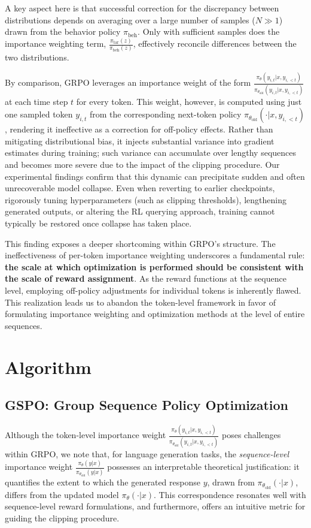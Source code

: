 A key aspect here is that successful correction for the discrepancy between distributions depends on averaging over a large number of samples ($N \gg 1$) drawn from the behavior policy $\pi_\text{beh}$. Only with sufficient samples does the importance weighting term, $\frac{ \pi_\text{tar} (z) }{ \pi_\text{beh} (z)}$, effectively reconcile differences between the two distributions.

By comparison, GRPO leverages an importance weight of the form $\frac{ \pi_{\theta} (y_{i,t} | x, y_{i,<t}) }{ \pi_{\theta_\text{old}} (y_{i,t} | x,y_{i,<t})}$ at each time step $t$ for every token. This weight, however, is computed using just one sampled token $y_{i,t}$ from the corresponding next-token policy $\pi_{\theta_\text{old}}( \cdot | x, y_{i, <t})$, rendering it ineffective as a correction for off-policy effects. Rather than mitigating distributional bias, it injects substantial variance into gradient estimates during training; such variance can accumulate over lengthy sequences and becomes more severe due to the impact of the clipping procedure. Our experimental findings confirm that this dynamic can precipitate sudden and often unrecoverable model collapse. Even when reverting to earlier checkpoints, rigorously tuning hyperparameters (such as clipping thresholds), lengthening generated outputs, or altering the RL querying approach, training cannot typically be restored once collapse has taken place.

This finding exposes a deeper shortcoming within GRPO's structure. The ineffectiveness of per-token importance weighting underscores a fundamental rule: \textbf{the scale at which optimization is performed should be consistent with the scale of reward assignment}. As the reward functions at the sequence level, employing off-policy adjustments for individual tokens is inherently flawed. This realization leads us to abandon the token-level framework in favor of formulating importance weighting and optimization methods at the level of entire sequences.

\section{Algorithm}

\subsection{GSPO: Group Sequence Policy Optimization}

Although the token-level importance weight $\frac{ \pi_{\theta} (y_{i,t} | x, y_{i,<t}) }{ \pi_{\theta_\text{old}} (y_{i,t} | x,y_{i,<t})}$ poses challenges within GRPO, we note that, for language generation tasks, the \textit{sequence-level} importance weight $\frac{ \pi_{\theta} (y | x) }{ \pi_{\theta_\text{old}} (y | x)}$ possesses an interpretable theoretical justification: it quantifies the extent to which the generated response $y$, drawn from $\pi_{\theta_\text{old}} (\cdot | x)$, differs from the updated model $\pi_{\theta} (\cdot | x)$. This correspondence resonates well with sequence-level reward formulations, and furthermore, offers an intuitive metric for guiding the clipping procedure.

